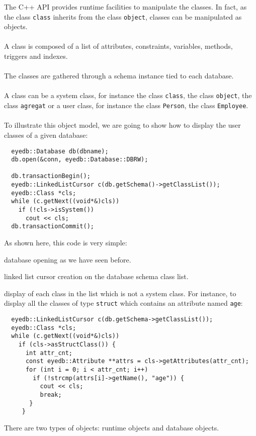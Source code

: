 The \eyedb C++ API provides runtime facilities to manipulate the \eyedb
classes. In fact, as the class \texttt{class} inherits from the
class \texttt{object}, \eyedb classes can be manipulated as objects.
\\
\\
A class is composed of a list of attributes, constraints,
variables, methods, triggers and indexes.
\\
\\
The classes are gathered through a schema instance tied to
each database.
\\
\\
A class can be a system class, for instance the class \texttt{class}, the
class \texttt{object}, the class \texttt{agregat} or a user class, for
instance the class \texttt{Person}, the class \texttt{Employee}.
\\
\\
To illustrate this object model, we are going to show how to display the
user classes of a given database:
\verbsize
\begin{verbatim}
  eyedb::Database db(dbname);
  db.open(&conn, eyedb::Database::DBRW);

  db.transactionBegin();
  eyedb::LinkedListCursor c(db.getSchema()->getClassList());
  eyedb::Class *cls;
  while (c.getNext((void*&)cls))
    if (!cls->isSystem())
      cout << cls;
  db.transactionCommit();
\end{verbatim}
\normalsize
As shown here, this code is very simple:
\be
\item database opening as we have seen before.
\item linked list cursor creation on the database schema class list.
\item display of each class in the list which is not a system class.
\ee
For instance, to display all the classes of type \texttt{struct} which contains
an attribute named \texttt{age}:
\verbsize
\begin{verbatim}
  eyedb::LinkedListCursor c(db.getSchema->getClassList());
  eyedb::Class *cls;
  while (c.getNext((void*&)cls))
    if (cls->asStructClass()) {
      int attr_cnt;
      const eyedb::Attribute **attrs = cls->getAttributes(attr_cnt);
      for (int i = 0; i < attr_cnt; i++)
        if (!strcmp(attrs[i]->getName(), "age")) {
          cout << cls;
          break;
       }
     }
\end{verbatim}
\normalsize
{}
There are two types of objects: runtime objects and database objects.
